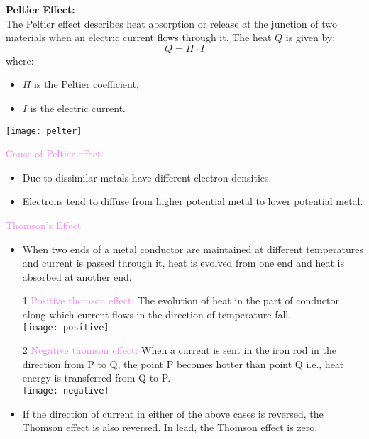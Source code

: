 \documentclass{beamer}
\begin{document}
\begin{frame}

\textbf{Peltier Effect:} \\
The Peltier effect describes heat absorption or release at the junction of two materials when an electric current flows through it. The heat \( Q \) is given by:
\[
Q = \Pi \cdot I
\]
where:
\begin{itemize}
    \item \( \Pi \) is the Peltier coefficient,
    \item \( I \) is the electric current.
\end{itemize}
\begin{center}
\texttt{[image: pelter]}
\end{center}
\textcolor{violet}{Cause of Peltier effect}
\begin{itemize}
\item Due to dissimilar metals have different electron densities.
\item Electrons tend to diffuse from higher potential metal to lower potential metal.
\end{itemize}
\end{frame}
\begin{frame}
\textcolor{violet}{Thomson's Effect}\\
\begin{itemize}
\item When two ends of a metal conductor are maintained at different temperatures and current is passed through it, heat is evolved from one end and heat is absorbed at another end. 
\item[1] \textcolor{violet}{Positive thomson effect:} The evolution of heat in the part of conductor along which current flows in
the direction of temperature fall.\\
\texttt{[image: positive]}
\item[2] \textcolor{violet}{Negative thomson effect:} When a current is sent in the iron rod in the direction from P to Q, the point P becomes hotter than point Q i.e., heat energy is transferred from Q to P.\\
\texttt{[image: negative]}
\item If the direction of current in either of the above cases is reversed, the Thomson effect is also reversed. In lead, the Thomson effect is zero.
\end{itemize}

\end{frame}
\end{document}
